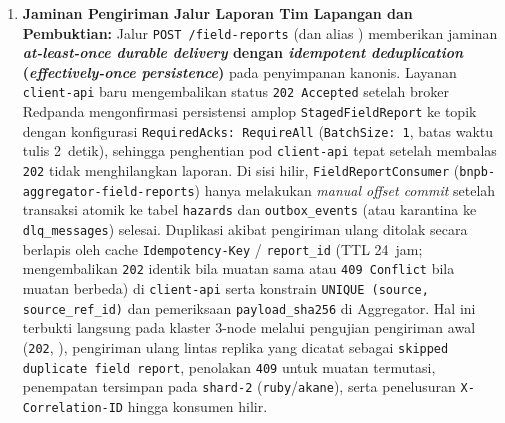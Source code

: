 \begin{enumerate}
    \item \textbf{Jaminan Pengiriman Jalur Laporan Tim Lapangan dan Pembuktian:} Jalur \texttt{POST /field-reports} (dan alias ) memberikan jaminan \textbf{\textit{at-least-once durable delivery} dengan \textit{idempotent deduplication} (\textit{effectively-once persistence})} pada penyimpanan kanonis. Layanan \texttt{client-api} baru mengembalikan status \texttt{202 Accepted} setelah broker Redpanda mengonfirmasi persistensi amplop \texttt{StagedFieldReport} ke topik  dengan konfigurasi \texttt{RequiredAcks: RequireAll} (\texttt{BatchSize: 1}, batas waktu tulis 2~detik), sehingga penghentian pod \texttt{client-api} tepat setelah membalas \texttt{202} tidak menghilangkan laporan. Di sisi hilir, \texttt{FieldReportConsumer} (\texttt{bnpb-aggregator-field-reports}) hanya melakukan \textit{manual offset commit} setelah transaksi atomik ke tabel \texttt{hazards} dan \texttt{outbox\_events} (atau karantina ke \texttt{dlq\_messages}) selesai. Duplikasi akibat pengiriman ulang ditolak secara berlapis oleh cache \texttt{Idempotency-Key} / \texttt{report\_id} (TTL 24~jam; mengembalikan \texttt{202} identik bila muatan sama atau \texttt{409 Conflict} bila muatan berbeda) di \texttt{client-api} serta konstrain \texttt{UNIQUE (source, source\_ref\_id)} dan pemeriksaan \texttt{payload\_sha256} di Aggregator. Hal ini terbukti langsung pada klaster 3-node melalui pengujian pengiriman awal (\texttt{202}, ), pengiriman ulang lintas replika yang dicatat sebagai \texttt{skipped duplicate field report}, penolakan \texttt{409} untuk muatan termutasi, penempatan tersimpan pada \texttt{shard-2} (\texttt{ruby}/\texttt{akane}), serta penelusuran \texttt{X-Correlation-ID} hingga konsumen hilir.
\end{enumerate}
